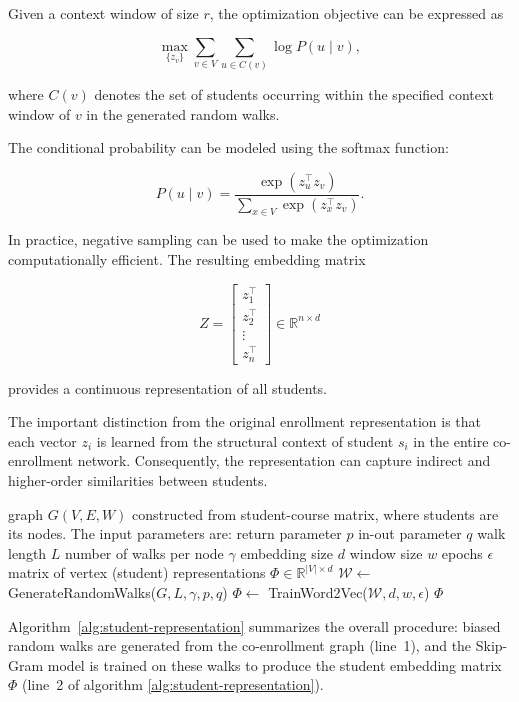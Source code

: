 \documentclass[pdflatex,sn-mathphys-num,iicol]{sn-jnl}%
\theoremstyle{thmstyleone}%
\theoremstyle{thmstyletwo}%
\theoremstyle{thmstylethree}%
\begin{document}
Given a context window of size $r$, the optimization objective can be expressed as

$$
\max_{\{z_v\}}
\sum_{v\in V}
\sum_{u\in C(v)}
\log P(u\mid v),
$$

where $C(v)$ denotes the set of students occurring within the specified context window of $v$ in the generated random walks.

The conditional probability can be modeled using the softmax function:

$$
P(u\mid v)
=
\frac{\exp(z_u^\top z_v)}
{\sum_{x\in V}\exp(z_x^\top z_v)}.
$$

In practice, negative sampling can be used to make the optimization computationally efficient. The resulting embedding matrix

$$
Z=
\begin{bmatrix}
z_1^\top\\
z_2^\top\\
\vdots\\
z_n^\top
\end{bmatrix}
\in\mathbb{R}^{n\times d}
$$

provides a continuous representation of all students.

The important distinction from the original enrollment representation is that each vector $z_i$ is learned from the structural context of student $s_i$ in the entire co-enrollment network. Consequently, the representation can capture indirect and higher-order similarities between students.



\begin{algorithm}[t]
\begin{algorithmic}[1]
\Require graph $G(V,E,W)$ constructed from student-course matrix, where students are its nodes. The input parameters are:\newline
return parameter $p$\newline
in-out parameter $q$\newline
walk length $L$\newline
number of walks per node $\gamma$\newline
embedding size $d$\newline
window size $w$\newline 
epochs $\epsilon$
\Ensure matrix of vertex (student) representations $\Phi \in \mathbb{R}^{|V| \times d}$
    \State $\mathcal{W} \gets$ GenerateRandomWalks($G, L, \gamma, p, q$) 
    \State $\Phi \gets$  TrainWord2Vec($\mathcal{W}, d, w, \epsilon$) 
    \State \Return $\Phi$ 
\end{algorithmic}
\caption{Student Representation Learning using Node2Vec}
\label{alg:student-representation}
\end{algorithm}
Algorithm~\ref{alg:student-representation} summarizes the overall procedure: biased random walks are generated from the co-enrollment graph (line~1), and the Skip-Gram model is trained on these walks to produce the student embedding matrix $\Phi$ (line~2 of algorithm \ref{alg:student-representation}).
\end{document}
